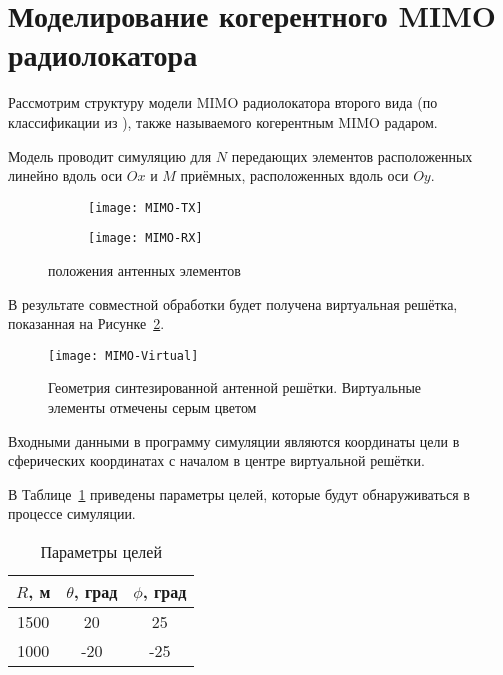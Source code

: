 \section{Моделирование когерентного MIMO радиолокатора}\label{sect:mimo-modeling}

Рассмотрим структуру модели MIMO радиолокатора второго вида (по классификации из \cite{li2008mimo}),
также называемого когерентным MIMO радаром.

Модель проводит симуляцию для $N$ передающих элементов расположенных линейно вдоль оси
$Ox$ и $M$ приёмных, расположенных вдоль оси $Oy$.

\begin{figure}[H]
    \centering
    \begin{subfigure}[b]{0.49\textwidth}
        \centering
        \hspace*{-3ex}
        \texttt{[image: MIMO-TX]}
        \caption{}%
    \end{subfigure}
    \hfill
    \begin{subfigure}[b]{0.49\textwidth}
        \centering
        \hspace*{-3ex}
        \texttt{[image: MIMO-RX]}
        \caption{}%
    \end{subfigure}
    \caption{положения антенных элементов}%
    \label{fig:mimo-elemnt-pos}
\end{figure}


В результате совместной обработки будет получена виртуальная решётка, показанная на Рисунке~\ref{fig:mimo-virtual-array}.

\begin{figure}[H]
    \centering
    \texttt{[image: MIMO-Virtual]}
    \caption{Геометрия синтезированной антенной решётки. Виртуальные элементы отмечены серым цветом}%
    \label{fig:mimo-virtual-array}
\end{figure}

Входными данными в программу симуляции являются координаты цели в сферических координатах
с началом в центре виртуальной решётки.

В Таблице~\ref{table:mimo-model-parameters} приведены параметры целей, которые будут обнаруживаться в процессе симуляции.


\begin{table}[H]
    \centering
    \begin{tabular}{|c|c|c|}
        \hline
        $R$, м & $\theta$, град & $\phi$, град \\ \hline
        1500   & 20             & 25           \\ \hline
        1000   & -20            & -25          \\ \hline
    \end{tabular}
    \caption{Параметры целей}\label{table:mimo-model-parameters}
\end{table}

